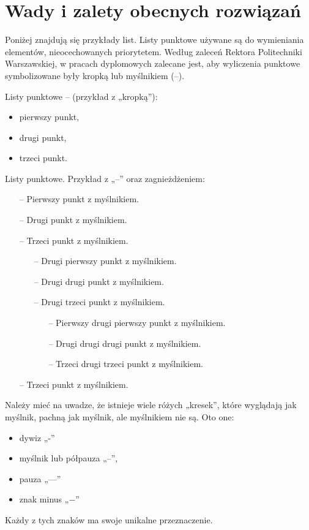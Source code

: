 \section{Wady i zalety obecnych rozwiązań}
\noindent Poniżej znajdują się przykłady list. Listy punktowe używane są do wymieniania elementów, 
nieocechowanych priorytetem. Według zaleceń Rektora Politechniki Warszawskiej, w pracach
dyplomowych zalecane jest, aby wyliczenia punktowe symbolizowane były kropką
lub myślnikiem (--).

\noindent Listy punktowe -- (przykład z „kropką”):
\begin{itemize}
    \item pierwszy punkt,
    \item drugi punkt,
    \item trzeci punkt.
\end{itemize}

\noindent Listy punktowe. Przykład z „--” oraz zagnieżdżeniem: 
\begin{itemize}[label=---]
    \item[--] Pierwszy punkt z myślnikiem.
    \item[--] Drugi punkt z myślnikiem.
    \item[--] Trzeci punkt z myślnikiem.
    \begin{itemize}
        \item[--] Drugi pierwszy punkt z myślnikiem.
        \item[--] Drugi drugi punkt z myślnikiem.
        \item[--] Drugi trzeci punkt z myślnikiem.
        \begin{itemize}
            \item[--] Pierwszy drugi pierwszy punkt z myślnikiem.
            \item[--] Drugi drugi drugi punkt z myślnikiem.
            \item[--] Trzeci drugi trzeci punkt z myślnikiem.
        \end{itemize}    
    \end{itemize} 
    
    \item[--] Trzeci punkt z myślnikiem.
\end{itemize}

\noindent Należy mieć na uwadze, że istnieje wiele różych „kresek”, które wyglądają jak 
myślnik, pachną jak myślnik, ale myślnikiem nie są. Oto one:
\begin{itemize}[label=--]
    \item dywiz „-”
    \item myślnik lub półpauza „--”,
    \item pauza „---”
    \item znak minus „$-$”
\end{itemize}   
Każdy z tych znaków ma swoje unikalne przeznaczenie. 

